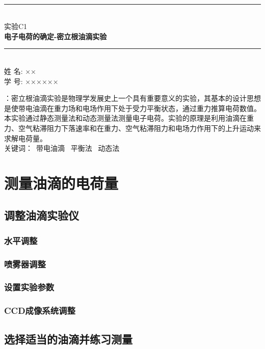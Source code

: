 \documentclass[c5size,amstex,a4paper,twoside]{ctexart}
\newcommand{\li}  {\CJKfamily{li}}  %
\begin{document}
\thispagestyle{empty}
\begin{center}
~\\[6cm]\rule{\linewidth}{0.5mm} \\[6mm]
{\Large 实验C1\\\bf\li\huge 电子电荷的确定-密立根油滴实验\\[6mm]}\rule{\linewidth}{0.5mm}\\[2cm]
{\Large 姓 名: ×\hspace{0.6in}×}\\[.3cm]
{\Large 学 号:  ××××××}\\[.3cm]
{\href{mailto:xxxxxxx}{}}  %
\end{center}


\newpage


：密立根油滴实验是物理学发展史上一个具有重要意义的实验，其基本的设计思想是使带电油滴在重力场和电场作用下处于受力平衡状态，通过重力推算电荷数值。本实验通过静态测量法和动态测量法测量电子电荷。实验的原理是利用油滴在重力、空气粘滞阻力下落速率和在重力、空气粘滞阻力和电场力作用下的上升运动来求解电荷量。\\
关键词：~带电油滴 ~平衡法 ~动态法

\section{测量油滴的电荷量}

\subsection{调整油滴实验仪}
\subsubsection{水平调整}
\subsubsection{喷雾器调整}
\subsubsection{设置实验参数}
\subsubsection{CCD成像系统调整}

\subsection{选择适当的油滴并练习测量}
\end{document}
